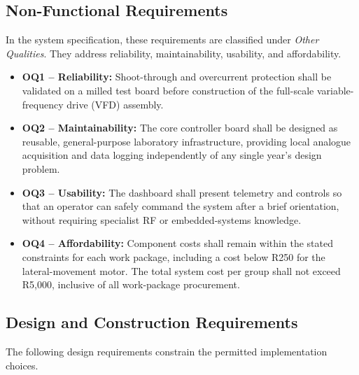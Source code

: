 \subsection{Non-Functional Requirements}
\label{subsec:nonfunc-req}

In the system specification, these requirements are classified
under \textit{Other Qualities}. They address reliability,
maintainability, usability, and affordability.

\begin{itemize}
    \item \textbf{OQ1 -- Reliability:}
    Shoot-through and overcurrent protection shall be
    validated on a milled test board before construction
    of the full-scale variable-frequency drive (VFD)
    assembly.

    \item \textbf{OQ2 -- Maintainability:}
    The core controller board shall be designed as reusable,
    general-purpose laboratory infrastructure, providing
    local analogue acquisition and data logging independently
    of any single year's design problem.

    \item \textbf{OQ3 -- Usability:}
    The dashboard shall present telemetry and controls so
    that an operator can safely command the system after
    a brief orientation, without requiring specialist RF
    or embedded-systems knowledge.

    \item \textbf{OQ4 -- Affordability:}
    Component costs shall remain within the stated constraints
    for each work package, including a cost below R250 for
    the lateral-movement motor. The total system cost per
    group shall not exceed R5,000, inclusive of all
    work-package procurement.
\end{itemize}


\subsection{Design and Construction Requirements}
\label{subsec:design-req}

The following design requirements constrain the permitted
implementation choices.

